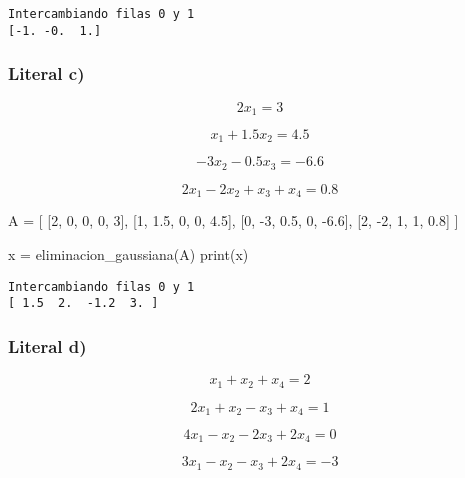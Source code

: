\documentclass[
  letterpaper,
  DIV=11,
  numbers=noendperiod]{scrartcl}
\newenvironment{Shaded}{\begin{snugshade}}{\end{snugshade}}
\newcommand{\BuiltInTok}[1]{\textcolor[rgb]{0.00,0.23,0.31}{#1}}
\newcommand{\DecValTok}[1]{\textcolor[rgb]{0.68,0.00,0.00}{#1}}
\newcommand{\FloatTok}[1]{\textcolor[rgb]{0.68,0.00,0.00}{#1}}
\newcommand{\NormalTok}[1]{\textcolor[rgb]{0.00,0.23,0.31}{#1}}
\newcommand{\OperatorTok}[1]{\textcolor[rgb]{0.37,0.37,0.37}{#1}}
\begin{document}
\begin{verbatim}
Intercambiando filas 0 y 1
[-1. -0.  1.]
\end{verbatim}

\subsubsection{Literal c)}\label{literal-c-1}

\[2x_1 = 3\]

\[x_1 + 1.5x_2= 4.5\]

\[- 3x_2 - 0.5x_3 = -6.6\]

\[2x_1 - 2x_2 + x_3 + x_4 = 0.8\]

\begin{Shaded}
\begin{Highlighting}[]

\NormalTok{A }\OperatorTok{=}\NormalTok{ [}
\NormalTok{    [}\DecValTok{2}\NormalTok{, }\DecValTok{0}\NormalTok{, }\DecValTok{0}\NormalTok{, }\DecValTok{0}\NormalTok{, }\DecValTok{3}\NormalTok{],}
\NormalTok{    [}\DecValTok{1}\NormalTok{, }\FloatTok{1.5}\NormalTok{, }\DecValTok{0}\NormalTok{, }\DecValTok{0}\NormalTok{, }\FloatTok{4.5}\NormalTok{],}
\NormalTok{    [}\DecValTok{0}\NormalTok{, }\OperatorTok{{-}}\DecValTok{3}\NormalTok{, }\FloatTok{0.5}\NormalTok{, }\DecValTok{0}\NormalTok{, }\OperatorTok{{-}}\FloatTok{6.6}\NormalTok{],}
\NormalTok{    [}\DecValTok{2}\NormalTok{, }\OperatorTok{{-}}\DecValTok{2}\NormalTok{, }\DecValTok{1}\NormalTok{, }\DecValTok{1}\NormalTok{, }\FloatTok{0.8}\NormalTok{]}
\NormalTok{]}

\NormalTok{x }\OperatorTok{=}\NormalTok{ eliminacion\_gaussiana(A)}
\BuiltInTok{print}\NormalTok{(x)}
\end{Highlighting}
\end{Shaded}

\begin{verbatim}
Intercambiando filas 0 y 1
[ 1.5  2.  -1.2  3. ]
\end{verbatim}

\subsubsection{Literal d)}\label{literal-d-1}

\[x_1 + x_2 + x_4 = 2\]

\[2x_1 + x_2 - x_3 + x_4 = 1\]

\[4x_1 - x_2 - 2x_3 + 2x_4 = 0\]

\[3x_1 - x_2 - x_3 + 2x_4 = -3\]
\end{document}
